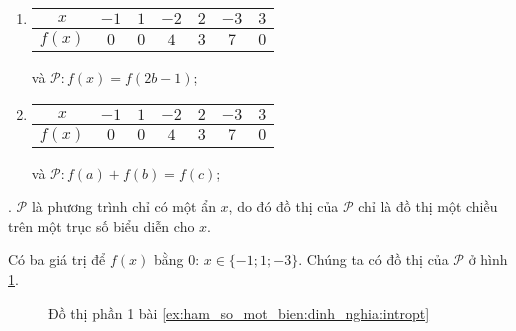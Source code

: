 \begin{enumerate}
   \item
   \begin{tabular}{|c|c|c|c|c|c|c|}
      \hline
      $x$ & $-1$ & $1$ & $-2$ & $2$ & $-3$ & $3$\\
      \hline
      $f(x)$ & $0$ & $0$ & $4$ & $3$ & $7$ & $0$\\
      \hline
   \end{tabular} và $\mathcal{P}: f(x) = f(2b - 1)$;

   \item 
   \begin{tabular}{|c|c|c|c|c|c|c|}
      \hline
      $x$ & $-1$ & $1$ & $-2$ & $2$ & $-3$ & $3$\\
      \hline
      $f(x)$ & $0$ & $0$ & $4$ & $3$ & $7$ & $0$\\
      \hline
   \end{tabular} và $\mathcal{P}: f(a) + f(b) = f(c)$;
\end{enumerate}


{
   \begin{minipageindent}{0.48\textwidth}
      . $\mathcal{P}$ là phương trình chỉ có một ẩn $x$, do đó đồ thị của $\mathcal{P}$ chỉ là đồ thị một chiều trên một trục số biểu diễn cho $x$.

      Có ba giá trị để $f(x)$ bằng $0$: $x\in \{-1; 1; -3\}$. Chúng ta có đồ thị của $\mathcal{P}$ ở hình \ref{fig:ham_so_mot_bien:dinh_nghia:dtp1}.
   \end{minipageindent}
   \hfill
   \begin{minipageindent}{0.48\textwidth}
      \begin{figure}[H]
         \centering
         \caption{Đồ thị phần 1 bài \ref{ex:ham_so_mot_bien:dinh_nghia:intropt}}
         \label{fig:ham_so_mot_bien:dinh_nghia:dtp1}
      \end{figure}
   \end{minipageindent}
}


